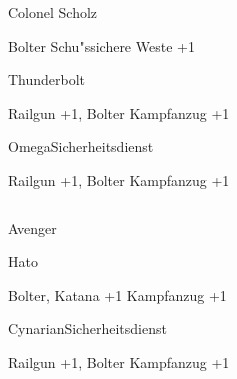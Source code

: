 \begin{column}[l]{0.45}
    \begin{nscsheet}[h]{Colonel Scholz}
        \nscstats[ATT=2,AGG=2,COM=3]
        \nscruler
        \begin{nscinventory}
            \nscitem[Waffen] Bolter
            \nscitem[R"ustung] Schu"ssichere Weste +1
        \end{nscinventory}
    \end{nscsheet}

    \begin{nscsheet}[h]{Thunderbolt}
        \nscstats[ATT=3,AGG=3,CON=2]
        \nscruler
        \begin{nscinventory}
            \nscitem[Waffen] Railgun +1, Bolter
            \nscitem[R"ustung] Kampfanzug +1
        \end{nscinventory}
    \end{nscsheet}

    \begin{nscsheet}[h]{Omega\newline{}Sicherheitsdienst}
        \nscstats[ATT=3,AGG=3,CON=2]
        \nscruler
        \begin{nscinventory}
            \nscitem[Waffen] Railgun +1, Bolter
            \nscitem[R"ustung] Kampfanzug +1
        \end{nscinventory}
    \end{nscsheet}    
\end{column}
\begin{column}[r]{0.45}
    \begin{nscsheet}[h]{Avenger}
        \nscstats[ATT=2,AGG=2,DEX=2,COM=3,CON=2]
        \nscruler
    \end{nscsheet}
    
    \begin{nscsheet}[h]{Hato}
        \nscstats[ATT=3,AGG=3,CON=2]
        \nscruler
        \begin{nscinventory}
            \nscitem[Waffen] Bolter, Katana +1
            \nscitem[R"ustung] Kampfanzug +1
        \end{nscinventory}
    \end{nscsheet}

    \begin{nscsheet}[h]{Cynarian\newline{}Sicherheitsdienst}
        \nscstats[ATT=2,AGG=2]
        \nscruler
        \begin{nscinventory}
            \nscitem[Waffen] Railgun +1, Bolter
            \nscitem[R"ustung] Kampfanzug +1        
        \end{nscinventory}
    \end{nscsheet}    
\end{column}


